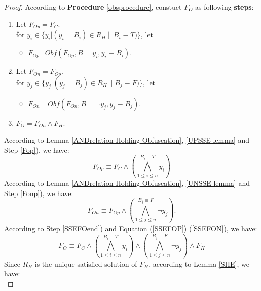 \documentclass[conference,compsocconf]{IEEEtran}
\begin{document}
\begin{proof}
According to \textbf{Procedure} \ref{obsprocedure}, constuct $F_O$ as following \textbf{steps}:
\begin{enumerate}
\item \label{Fop}  
Let $F_{Op}=F_C$.  \\
for $y_i \in \{y_i|(y_i=B_{i})\in R_H \parallel B_i\equiv T)\}$, let
\begin{itemize}
 \item[] $F_{Op}$=$Obf(F_{Op},B=y_i,{y_i\equiv B_i})$. 
\end{itemize}
\item  \label{Fonp}
Let $F_{On}=F_{Op}$. \\
for $y_j \in \{y_j|(y_j=B_j)\in R_H \parallel B_j\equiv F)\}$, let
\begin{itemize}
 \item[] $F_{On}$= $Obf(F_{On},B=\neg y_j,{y_j\equiv B_j})$.
\end{itemize}
\item  \label{SSEFOend}
$F_{O}=F_{On}\wedge F_H$.
\end{enumerate}
According to Lemma \ref{ANDrelation-Holding-Obfuscation}, \ref{UPSSE-lemma} and Step \ref{Fop}), we have:
\begin{equation}\label{SSEFOP}
F_{Op} \equiv F_C\wedge (\bigwedge_{1\leqslant i\leqslant n}^{B_i \equiv T}y_i) 
\end{equation}
According to Lemma \ref{ANDrelation-Holding-Obfuscation}, \ref{UNSSE-lemma} and Step \ref{Fonp}), we have:
\begin{equation}\label{SSEFON}
F_{On} \equiv F_{Op}\wedge (\bigwedge_{1\leqslant j\leqslant n}^{B_j \equiv F}\neg y_j). 
\end{equation}
According to Step \ref{SSEFOend}) and Equation (\ref{SSEFOP}) (\ref{SSEFON}), we have: 
\begin{equation}\label{SSEFO}
F_{O} \equiv F_C \wedge 
(\bigwedge_{1\leqslant i\leqslant n}^{B_i \equiv T}y_i)\wedge
(\bigwedge_{1\leqslant j\leqslant n}^{B_j \equiv F}\neg y_j) \wedge F_H
\end{equation}
Since ${R_H}$ is the unique satisfied solution of $F_H$,
according to Lemma \ref{SHE}, we have: 
\begin{equation}\label{SSEFH}

\end{equation}
\end{proof}
\end{document}

